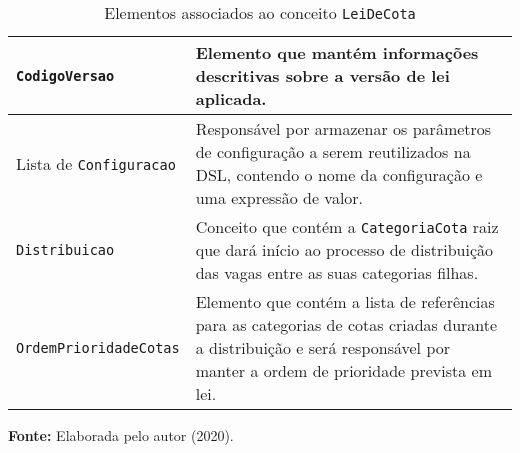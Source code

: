 \begin{table}[ht]
\caption{Elementos associados ao conceito \texttt{LeiDeCota}}
\label{tblelementoslei}
\centering
\begin{tabular}{|p{4.2cm}|p{10cm}|}
\hline
\texttt{CodigoVersao}          & Elemento que mantém informações descritivas sobre a versão de lei aplicada.                                                                                           \\ \hline
Lista de \texttt{Configuracao} & Responsável por armazenar os parâmetros de configuração a serem reutilizados na DSL, contendo o nome da configuração e uma expressão de valor.                          \\ \hline
\texttt{Distribuicao}          & Conceito que contém a \texttt{CategoriaCota} raiz que dará início ao processo de distribuição das vagas entre as suas categorias filhas.                                       \\ \hline
\texttt{OrdemPrioridadeCotas}  & Elemento que contém a lista de referências para as categorias de cotas criadas durante a distribuição e será responsável por manter a ordem de prioridade prevista em lei. \\ \hline
\end{tabular}
  \par\medskip\textbf{Fonte:} Elaborada pelo autor (2020). \par\medskip
\end{table}

   
    